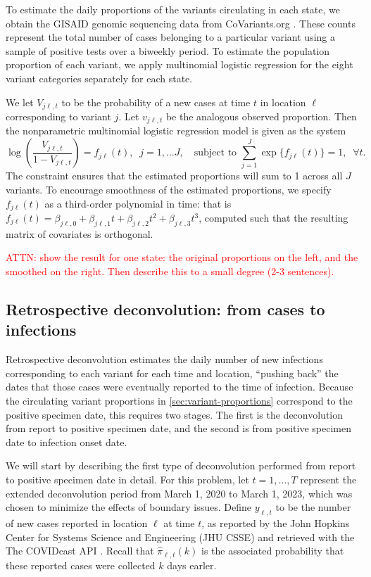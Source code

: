 \documentclass{article}
\newcommand{\attn }[1]{\textcolor{red}{ATTN: #1}}
\begin{document}
To estimate the daily proportions of the variants circulating in each state, we
obtain the GISAID genomic sequencing data from CoVariants.org
\citep{hodcroft2021covariants, elbe2017data}. These counts represent the total
number of cases belonging to a particular variant using
a sample of positive tests over a biweekly period. To estimate the population
proportion of each variant, we apply multinomial logistic regression 
for the eight variant categories separately for each state.

We let $V_{j\ell,t}$ to be the probability of a new cases at time $t$ in location
$\ell$ corresponding to variant $j$. Let $v_{j\ell,t}$ be the analogous observed
proportion. Then the nonparametric multinomial logistic regression model is given
as the system
\begin{equation}
\log\left(\frac{V_{j\ell,t}}{1-V_{j\ell,t}}\right) = f_{j\ell}(t),\;\; j=1,\ldots J,\quad
\textrm{subject to }\sum_{j=1}^J \exp\{f_{j\ell}(t)\} = 1, \;\;\forall t.
\end{equation}
The constraint ensures that the estimated proportions will sum to 1 across all
$J$ variants. To encourage smoothness of the estimated proportions, we specify
$f_{j\ell}(t)$ as a third-order polynomial in time: that is $f_{j\ell}(t) =
\beta_{j\ell,0} + \beta_{j\ell,1} t + \beta_{j\ell,2}t^2 + \beta_{j\ell,3}t^3$,
computed such that the resulting matrix of covariates is orthogonal.

\attn{show the result for one
state: the original proportions on the left, and the smoothed on the
right. Then describe this to a small degree (2-3 sentences).}



\subsection{Retrospective deconvolution: from cases to infections}

Retrospective deconvolution estimates the daily number of new infections
corresponding to each variant for each time and location, ``pushing back'' the
dates that those cases were eventually reported to the time of infection.
Because the circulating variant proportions in \autoref{sec:variant-proportions}
correspond to the positive specimen date, this requires two stages. The first is
the deconvolution from report to positive specimen date, and the second is from
positive specimen date to infection onset date.

We will start by describing the first type of deconvolution performed from
report to positive specimen date in detail. For this problem, let $t=1,\ldots,T$
represent the extended deconvolution period from March 1, 2020 to March 1, 2023,
which was chosen to minimize the effects of boundary issues. Define $y_{\ell,t}$
to be the number of new cases reported in location $\ell$ at time $t$, as
reported by the John Hopkins Center for Systems Science and Engineering (JHU
CSSE)\citealp{dong2020interactive} and retrieved with the The COVIDcast API
\citep{reinhart2021open}. Recall that $\widehat{\pi}_{\ell,t}(k)$ is the
associated probability that these reported cases were collected $k$ days earler. 
\end{document}
